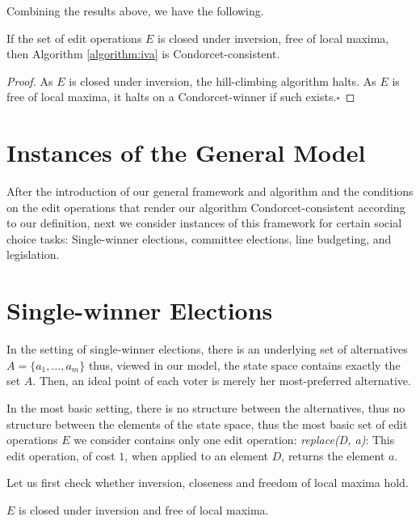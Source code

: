 \documentclass[sigconf]{aamas}  %
\newcommand{\qqed}{\hfill$\square$}
\begin{document}
Combining the results above, we have the following.

\begin{corollary}\label{corollary:IIAV--condorcet}
If the set of edit operations $E$ is closed under inversion, free of local maxima, then Algorithm \ref{algorithm:iva} is Condorcet-consistent.
\end{corollary}

\begin{proof}
%
As $E$ is closed under inversion, the hill-climbing algorithm halts. As $E$ is free of local maxima, it halts on a Condorcet-winner if such exists.\qqed
%
\end{proof}


\section{Instances of the General Model}

After the introduction of our general framework and algorithm and the conditions on the edit operations that render our algorithm Condorcet-consistent according to our definition, next we consider instances of this framework for certain social choice tasks:
  Single-winner elections,
  committee elections,
  line budgeting,
  and legislation.
  

\section{Single-winner Elections}

In the setting of single-winner elections, there is an underlying set of alternatives $A = \{a_1, \ldots, a_m\}$ thus, viewed in our model, the state space contains exactly the set $A$. Then, an ideal point of each voter is merely her most-preferred alternative.

In the most basic setting, there is no structure between the alternatives, thus no structure between the elements of the state space, thus the most basic set of edit operations $E$ we consider contains only one edit operation:
  \emph{replace(D, a)}:
    This edit operation, of cost $1$, when applied to an element $D$, returns the element $a$.

Let us first check whether inversion, closeness and freedom of local maxima hold.

\begin{lemma}
  $E$ is closed under inversion and free of local maxima.
\end{lemma}
\end{document}
